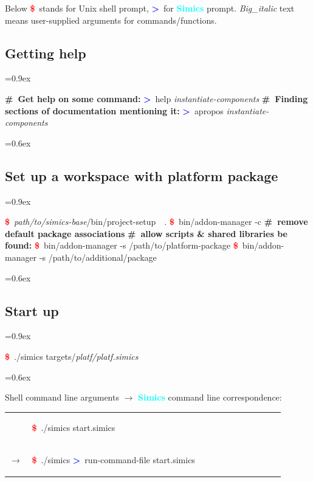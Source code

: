 \documentclass[8pt]{extarticle}
\newenvironment{code}[1][]{%
\begin{prebox}[#1]\obeylines%
\fontdimen2\font=0.9ex%
}{%
\end{prebox}%
\fontdimen2\font=0.6ex%
}
\newenvironment{codem}[2][\linewidth]{%
\begin{minipage}{#1}%
\begin{prebox}[colback=#2]\obeylines}{%
\end{prebox}%
\end{minipage}}
\newenvironment{code9}{%
\begin{codem}[0.9\linewidth]{green!10}}{\end{codem}}
\newcommand{\prompt}{\textcolor{red}{\textbf{\$}\ }}
\newcommand{\sprompt}{\textcolor{blue}{\textbf{>}\ }}
\newcommand{\cmtcommon}[1]{\textcolor{Sepia}{\textbf{#1}}}
\newcommand{\cmt}[1]{\cmtcommon{\#\ #1}}
\newcommand{\p}[1]{\textit{\large#1}}
\newcommand{\Simics}{\textcolor{cyan}{\textbf{Simics}}}
\begin{document}
\begin{multicols*}{3}
    Below \prompt stands for Unix shell prompt, \sprompt for \Simics{} prompt.
    \p{Big_italic} text means user-supplied arguments for commands/functions.

\subsection{Getting help}
\begin{code}
    \cmt{Get help on some command:}
    \sprompt{help \p{instantiate-components}}
    \cmt{Finding sections of documentation mentioning it:}
    \sprompt{apropos \p{instantiate-components}}
\end{code}

\subsection{Set up a workspace with platform package}
    \begin{code}
        \prompt \p{path/to/simics-base}/bin/project-setup\ \ .
        \prompt bin/addon-manager -c  \cmt{remove default package associations}
        \cmt{allow scripts \& shared libraries be found:}
        \prompt bin/addon-manager -s /path/to/platform-package
        \prompt bin/addon-manager -s /path/to/additional/package
    \end{code}

\subsection{Start up}
    \begin{code}
        \prompt ./simics targets/\p{platf/platf.simics}
    \end{code}

    
    Shell command line arguments $\longrightarrow$ \Simics{} command line 
        correspondence:

    \noindent\begin{tabular}{p{0.05\linewidth}p{0.85\linewidth}}
        &
        \begin{code9}
            \prompt ./simics start.simics
        \end{code9}
        \vspace{0.05cm}
        \\
        $\longrightarrow$ &
        \begin{code9}
            \prompt ./simics
            \sprompt run-command-file start.simics
        \end{code9}
        \vspace{0.2cm}
        \\


\end{tabular}
\end{multicols*}
\end{document}
